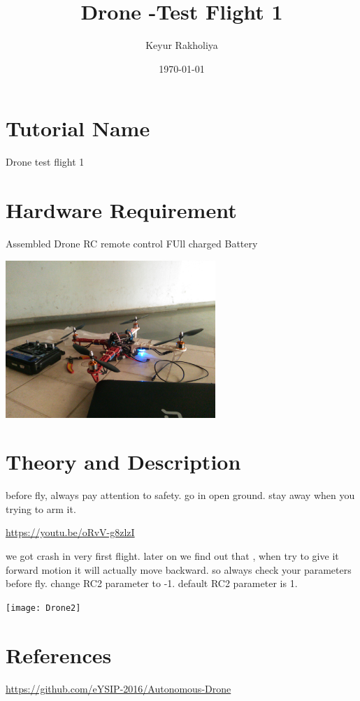 \documentclass[11pt,a4paper]{article}
\title{Drone -Test Flight 1}
\author{Keyur Rakholiya}
\date{\today}
\begin{document}
	\maketitle
	\newpage
	\tableofcontents
	\newpage
	\section{Tutorial Name}
	Drone test flight 1
	
	\section{Hardware Requirement}
	Assembled Drone
	RC remote control
	FUll charged Battery
	\begin{center}
		\includegraphics[width=300px]{Drone}
	\end{center}
	

	\newpage
	\section{Theory and Description}
		before fly, always pay attention to safety. go in open ground. stay away when you trying to arm it.\newline
		
		\url{https://youtu.be/oRvV-g8zlzI}\newline
		
		we got crash in very first flight. later on we find out that , when try to give it forward motion it will actually move backward. so always check your parameters before fly. 
		change RC2 parameter to -1. default RC2 parameter is 1.
		
		\texttt{[image: Drone2]}
		
	\section{References}
	\url{https://github.com/eYSIP-2016/Autonomous-Drone}
	
\end{document}

